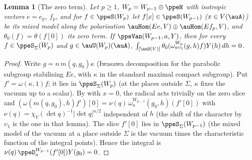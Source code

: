 \documentclass[10pt]{amsart}
\newtheorem{lemma}[theorem]{Lemma}
\theoremstyle{definition}
\theoremstyle{remark}
\begin{document}
\begin{lemma}[The zero term]\label{ppe:zero}
Let $p\ge1$, $W_p=W_{p-1}\oplus\ppeH$ with isotropic vectors $e=e_p$, $f_p$, and for
$f\in\ppeS(W_p)$ let $f[x]\in\ppeS(W_{p-1})$ ($x\in V(\auA)$) be its mixed model along the
polarisation $\auHom(Ee,V)\oplus\auHom(Ef_p,V)$, and $\theta_0(f)=\theta(f[0])$ its zero term. If
$\ppeVan(W_{p-1},a,Y)$, then for every $f\in\ppeS_\Sigma(W_p)$ and $g\in\auU(W_p)(\auA)$,
$\int_{[\auU(V)]}\theta_0(\omega^{W_p}_{a\upsilon_1}(g,h)f)Y(h)\,dh=0$.
\end{lemma}
\begin{proof}
Write $g=n\,m(q,g_0)\kappa$ (Iwasawa decomposition for the parabolic subgroup stabilising $Ee$,
with $\kappa$ in the standard maximal compact subgroup). Put $f'=\omega(\kappa,1)f$; it lies in
$\ppeS_\Sigma(W_p)$ (at the places outside $\Sigma$, $\kappa$ fixes the vacuum up to a scalar). By
{\cite[Lemma~3.62]{P53}} with $x=0$, the radical acts trivially on the zero slice and
$(\omega(m(q,g_0),h)f')[0]=\nu(q)\,\omega^{W_{p-1}}_a(g_0,h)(f'[0])$ with $\nu(q)=\chi_V(\det q)^{-1}
|\det q|^{n/2}$ independent of $h$ (the shift of the character by $\upsilon_1$ is the one in that
lemma). The slice $f'[0]$ lies in $\ppeS_\Sigma(W_{p-1})$ (the mixed model of the vacuum at a place
outside $\Sigma$ is the vacuum times the characteristic function of the integral points). Hence the
integral is $\nu(q)\,\ppeD^{W_{p-1}}_a(f'[0])Y(g_0)=0$.
\end{proof}
\end{document}
